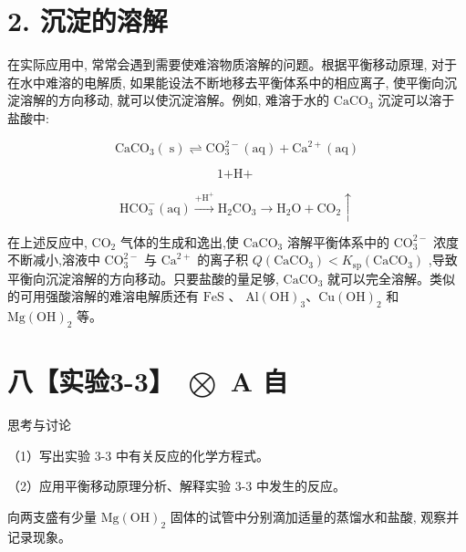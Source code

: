 \documentclass[10pt]{article}
\begin{document}
\section*{2. 沉淀的溶解}

在实际应用中, 常常会遇到需要使难溶物质溶解的问题。根据平衡移动原理, 对于在水中难溶的电解质, 如果能设法不断地移去平衡体系中的相应离子, 使平衡向沉淀溶解的方向移动, 就可以使沉淀溶解。例如, 难溶于水的 \({\mathrm{{CaCO}}}_{3}\) 沉淀可以溶于盐酸中:

\[
{\mathrm{{CaCO}}}_{3}\left( \mathrm{\;s}\right) \rightleftharpoons {\mathrm{{CO}}}_{3}^{2 - }\left( \mathrm{{aq}}\right) + {\mathrm{{Ca}}}^{2 + }\left( \mathrm{{aq}}\right)
\]

\[
\text{1+H+ }
\]

\[
{\mathrm{{HCO}}}_{3}^{ - }\left( \mathrm{{aq}}\right) \xrightarrow[]{+{\mathrm{H}}^{ + }}{\mathrm{H}}_{2}{\mathrm{{CO}}}_{3} \rightarrow {\mathrm{H}}_{2}\mathrm{O} + {\mathrm{{CO}}}_{2} \uparrow
\]

在上述反应中, \({\mathrm{{CO}}}_{2}\) 气体的生成和逸出,使 \({\mathrm{{CaCO}}}_{3}\) 溶解平衡体系中的 \({\mathrm{{CO}}}_{3}^{2 - }\) 浓度不断减小,溶液中 \({\mathrm{{CO}}}_{3}^{2 - }\) 与 \({\mathrm{{Ca}}}^{2 + }\) 的离子积 \(Q\left( {\mathrm{{CaCO}}}_{3}\right) < {K}_{\mathrm{{sp}}}\left( {\mathrm{{CaCO}}}_{3}\right)\) ,导致平衡向沉淀溶解的方向移动。只要盐酸的量足够, \({\mathrm{{CaCO}}}_{3}\) 就可以完全溶解。类似的可用强酸溶解的难溶电解质还有 \(\mathrm{{FeS}}\) 、 \(\mathrm{{Al}}{\left( \mathrm{{OH}}\right) }_{3}\text{、}\mathrm{{Cu}}{\left( \mathrm{{OH}}\right) }_{2}\) 和 \(\mathrm{{Mg}}{\left( \mathrm{{OH}}\right) }_{2}\) 等。

\section*{八【实验3-3】 \(\bigotimes\) A 自}

\begin{mdframed}

思考与讨论

（1）写出实验 3-3 中有关反应的化学方程式。

（2）应用平衡移动原理分析、解释实验 3-3 中发生的反应。

\end{mdframed}

向两支盛有少量 \(\mathrm{{Mg}}{\left( \mathrm{{OH}}\right) }_{2}\) 固体的试管中分别滴加适量的蒸馏水和盐酸, 观察并记录现象。

\begin{center}
\end{center}
\end{document}
